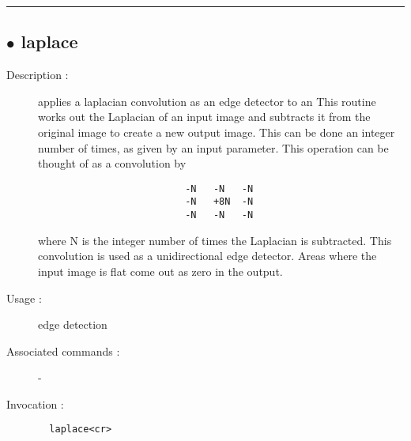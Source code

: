 \hrule \subsection*{$\bullet$ laplace}
\begin{description}
\item[Description :] applies a laplacian convolution as an edge detector to an This
routine works out the Laplacian of an input image and subtracts it from
the original image to create a new output image. This can be done an
integer number of times, as given by an input parameter. This operation
can be thought of as a convolution by

\begin{verbatim}
                          -N   -N   -N
                          -N   +8N  -N
                          -N   -N   -N
\end{verbatim}

where N is the integer number of times the Laplacian is subtracted. This
convolution is used as a unidirectional edge detector. Areas where the
input image is flat come out as zero in the output.
\item[Usage :] edge detection
\item[Associated commands :] -
\item[Invocation :]

\verb+  laplace<cr> +\end{description}

